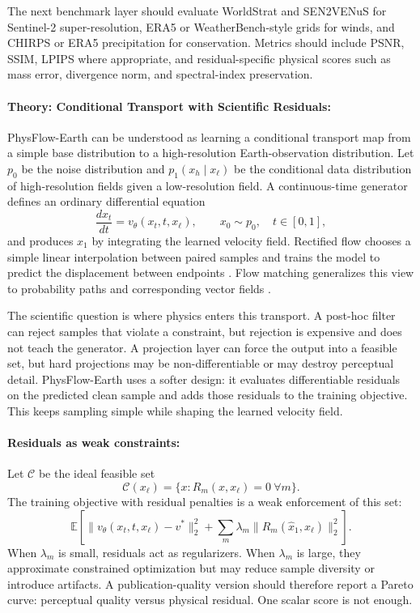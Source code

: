 \documentclass{article}
\begin{document}
The next benchmark layer should evaluate WorldStrat and SEN2VENuS for Sentinel-2 super-resolution, ERA5 or WeatherBench-style grids for winds, and CHIRPS or ERA5 precipitation for conservation. Metrics should include PSNR, SSIM, LPIPS where appropriate, and residual-specific physical scores such as mass error, divergence norm, and spectral-index preservation.

\paragraph{Theory: Conditional Transport with Scientific Residuals:}

PhysFlow-Earth can be understood as learning a conditional transport map from a simple base distribution to a high-resolution Earth-observation distribution. Let $p_0$ be the noise distribution and $p_1(x_h\mid x_{\ell})$ be the conditional data distribution of high-resolution fields given a low-resolution field. A continuous-time generator defines an ordinary differential equation
\begin{equation}
  \frac{d x_t}{dt}=v_{\theta}(x_t,t,x_{\ell}),\qquad x_0\sim p_0,\quad t\in[0,1],
\end{equation}
and produces $x_1$ by integrating the learned velocity field. Rectified flow chooses a simple linear interpolation between paired samples and trains the model to predict the displacement between endpoints \citep{liu2022rectified}. Flow matching generalizes this view to probability paths and corresponding vector fields \citep{lipman2023flow}.

The scientific question is where physics enters this transport. A post-hoc filter can reject samples that violate a constraint, but rejection is expensive and does not teach the generator. A projection layer can force the output into a feasible set, but hard projections may be non-differentiable or may destroy perceptual detail. PhysFlow-Earth uses a softer design: it evaluates differentiable residuals on the predicted clean sample and adds those residuals to the training objective. This keeps sampling simple while shaping the learned velocity field.

\paragraph{Residuals as weak constraints:}

Let $\mathcal{C}$ be the ideal feasible set
\begin{equation}
  \mathcal{C}(x_{\ell}) = \{x: R_m(x,x_{\ell})=0\ \forall m\}.
\end{equation}
The training objective with residual penalties is a weak enforcement of this set:
\begin{equation}
  \mathbb{E}\left[
  \|v_{\theta}(x_t,t,x_{\ell})-v^*\|_2^2
  +\sum_m \lambda_m \|R_m(\hat{x}_1,x_{\ell})\|_2^2
  \right].
\end{equation}
When $\lambda_m$ is small, residuals act as regularizers. When $\lambda_m$ is large, they approximate constrained optimization but may reduce sample diversity or introduce artifacts. A publication-quality version should therefore report a Pareto curve: perceptual quality versus physical residual. One scalar score is not enough.
\end{document}
